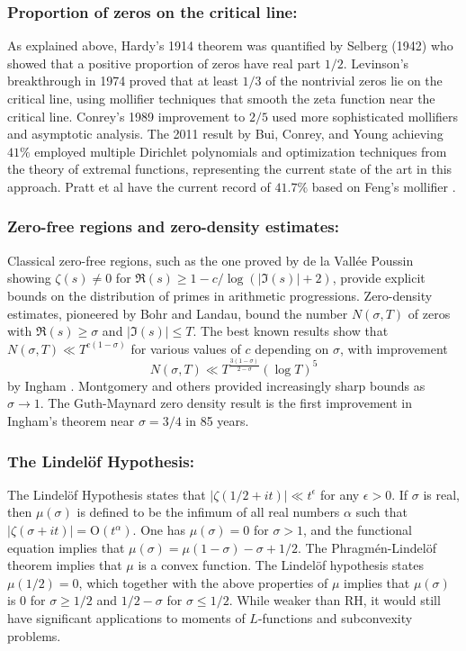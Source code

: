 \documentclass{article}
\begin{document}
    \subsubsection{Proportion of zeros on the critical line:} As explained above, Hardy's 1914 theorem \cite{Hardy}  was quantified by Selberg (1942) \cite{SelbergZeta} who showed that a positive proportion of zeros have real part $1/2$. Levinson's breakthrough in 1974 \cite{Levinson} proved that at least $1/3$ of the nontrivial zeros lie on the critical line, using mollifier techniques that smooth the zeta function near the critical line. Conrey's 1989 improvement \cite{Conrey1989} to $2/5$ used more sophisticated mollifiers and asymptotic analysis. The 2011 result by Bui, Conrey, and Young \cite{BuiConreyYoung} achieving $41\%$ employed multiple Dirichlet polynomials and optimization techniques from the theory of extremal functions, representing the current state of the art in this approach. Pratt et al \cite{Pratt} have the current record of $41.7 \%$ based on Feng's mollifier \cite{Feng}.

 \subsubsection{Zero-free regions and zero-density estimates:} Classical zero-free regions, such as the one proved by de la Vallée Poussin \cite{ValeePoussin} showing $\zeta(s) \neq 0$ for $\Re(s) \geq 1 - c/\log(|\Im(s)|+2)$, provide explicit bounds on the distribution of primes in arithmetic progressions. Zero-density estimates, pioneered by Bohr and Landau, bound the number $N(\sigma,T)$ of zeros with $\Re(s) \geq \sigma$ and $|\Im(s)| \leq T$. The best known results show that $N(\sigma,T) \ll T^{c(1-\sigma)}$ for various values of $c$ depending on $\sigma$, with improvement $$N(\sigma, T) \ll T^{\frac{3(1-\sigma)}{2-\sigma}}(\log T)^5$$ by Ingham \cite{Ingham1}. Montgomery and others provided increasingly sharp bounds as $\sigma \to 1$. The Guth-Maynard zero density result \cite{Guth} is the first improvement in Ingham's theorem near $\sigma=3 / 4$ in 85 years.
 


      
       
        \subsubsection{The Lindelöf Hypothesis:} The Lindelöf Hypothesis states that $\vert \zeta(1/2 + it) \vert \ll t^{\epsilon}$ for any $\epsilon > 0$. If $\sigma$ is real, then $\mu(\sigma)$ is defined to be the infimum of all real numbers $\alpha$ such that $\vert\zeta(\sigma+i t)\vert=\mathrm{O}\left(t^\alpha\right)$. One has $\mu(\sigma)=0$ for $\sigma>1$, and the functional equation  implies that $\mu(\sigma)=\mu(1-\sigma)-\sigma+1 / 2$. The Phragmén-Lindelöf theorem implies that $\mu$ is a convex function. The Lindelöf hypothesis states $\mu(1 / 2)=0$, which together with the above properties of $\mu$ implies that $\mu(\sigma)$ is 0 for $\sigma \geq 1 / 2$ and $1 / 2-\sigma$ for $\sigma \leq 1 / 2$.  While weaker than RH, it would still have significant applications to moments of $L$-functions and subconvexity problems.
        
\end{document}
